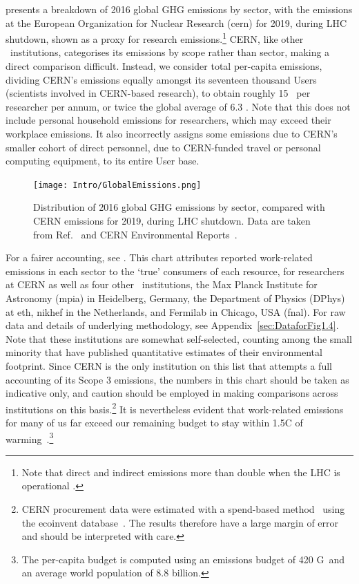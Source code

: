 \documentclass[../SustainableHEP.tex]{subfiles}
\begin{document}
 presents a breakdown of 2016 global GHG emissions by sector, with the emissions at the European Organization for Nuclear Research (\acrshort{cern}) for 2019, during LHC shutdown, shown as a proxy for research emissions.\footnote{Note that direct and indirect emissions more than double when the LHC is operational \cite{Environment:2737239}.}  CERN, like other \ACR\ institutions, categorises its emissions by scope rather than sector, making a direct comparison difficult.  Instead, we consider total
per-capita emissions, dividing CERN's emissions equally amongst its seventeen thousand Users (scientists involved in CERN-based research), to obtain roughly 15 \tCdOe\ per researcher per annum, or twice the global average of 6.3 \tCdOe.  Note that this does not include personal household emissions for researchers, which may exceed their workplace emissions.  It also incorrectly assigns some emissions due to CERN's smaller cohort of direct personnel, \eg due to CERN-funded travel or personal computing equipment, to its entire User base.  
%
\begin{figure}[!ht]
    \centering
    \texttt{[image: Intro/GlobalEmissions.png]}
    \caption[2016 global GHG emissions vs 2019 CERN emissions]%
        {Distribution of 2016 global GHG emissions by sector, compared with CERN emissions for 2019, during LHC shutdown. Data are taken from Ref.~\cite{OWIDGHGSector} and CERN Environmental Reports~\cite{Environment:2737239,CERN:2723123,Hartley}. \label{fig:intro-GlobalEmissions}}
    \end{figure}
%
For a fairer accounting, see .  This chart attributes reported work-related emissions in each sector to the `true' consumers of each resource, for researchers at CERN as well as four other \ACR\ institutions, the Max Planck Institute for Astronomy (\acrshort{mpia}) in Heidelberg, Germany, the Department of Physics (DPhys) at \acrshort{eth}, \acrshort{nikhef} in the Netherlands, and Fermilab in Chicago, USA (\acrshort{fnal}).  For raw data and details of underlying methodology, see Appendix~\ref{sec:DataforFig1.4}.  Note that these institutions are somewhat self-selected, counting among the small minority that have published quantitative estimates of their environmental footprint.  Since CERN is the only institution on this list that attempts a full accounting of its Scope 3 emissions, the numbers in this chart should be taken as indicative only, and caution should be employed in making comparisons across institutions on this basis.\footnote{CERN procurement data were estimated with a spend-based method~\cite{SpendBased} using the ecoinvent database~\cite{ecoinvent}. The results therefore have a large margin of error and should be interpreted with care.}   It is nevertheless evident that work-related emissions for many of us far exceed our remaining budget to stay within 
1.5\degree C of warming~\cite{IPCC2021reportSPM}.\footnote{The per-capita budget is computed using an emissions budget of 420 G\tCdOe\, and an average world population of 8.8 billion.} 
\end{document}
